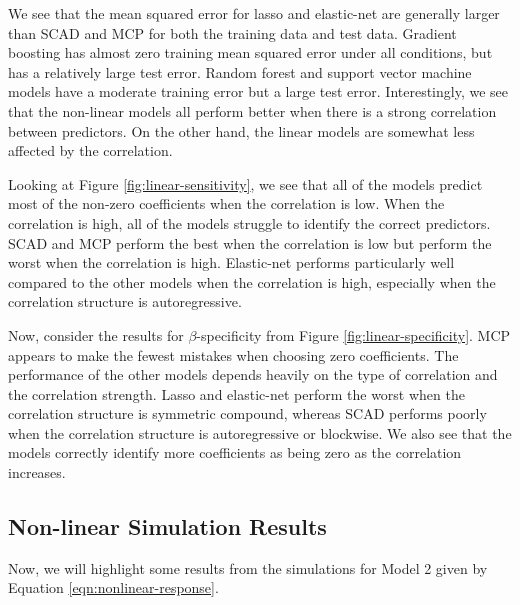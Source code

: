 \documentclass{article}
\begin{document}
	We see that the mean squared error for lasso and elastic-net are generally larger than SCAD and MCP for both the training data and test data. Gradient boosting has almost zero training mean squared error under all conditions, but has a relatively large test error. Random forest and support vector machine models have a moderate training error but a large test error. Interestingly, we see that the non-linear models all perform better when there is a strong correlation between predictors. On the other hand, the linear models are somewhat less affected by the correlation.
	
	Looking at Figure \ref{fig:linear-sensitivity}, we see that all of the models predict most of the non-zero coefficients when the correlation is low. When the correlation is high, all of the models struggle to identify the correct predictors. SCAD and MCP perform the best when the correlation is low but perform the worst when the correlation is high. Elastic-net performs particularly well compared to the other models when the correlation is high, especially when the correlation structure is autoregressive.
	
	Now, consider the results for $\beta$-specificity from Figure \ref{fig:linear-specificity}. MCP appears to make the fewest mistakes when choosing zero coefficients. The performance of the other models depends heavily on the type of correlation and the correlation strength. Lasso and elastic-net perform the worst when the correlation structure is symmetric compound, whereas SCAD performs poorly when the correlation structure is autoregressive or blockwise. We also see that the models correctly identify more coefficients as being zero as the correlation increases.
	
	\subsection{Non-linear Simulation Results}
	Now, we will highlight some results from the simulations for Model 2 given by Equation \ref{eqn:nonlinear-response}.
	
\end{document}
